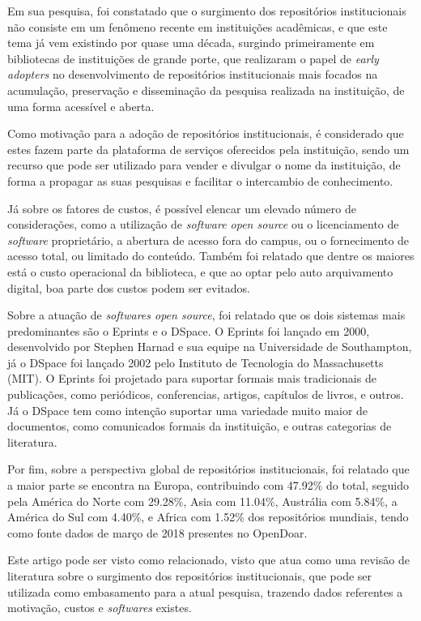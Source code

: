 Em sua pesquisa, foi constatado que o surgimento dos repositórios institucionais
não consiste em um fenômeno recente em instituições acadêmicas, e que este tema já vem
existindo por quase uma década, surgindo primeiramente em bibliotecas de instituições
de grande porte, que realizaram o papel de \emph{early adopters} no desenvolvimento
de repositórios institucionais mais focados na acumulação, preservação e disseminação
da pesquisa realizada na instituição, de uma forma acessível e aberta.

Como motivação para a adoção de repositórios institucionais, é considerado
que estes fazem parte da plataforma de serviços oferecidos pela instituição,
sendo um recurso que pode ser utilizado para vender e divulgar o nome da instituição,
de forma a propagar as suas pesquisas e facilitar o intercambio de conhecimento.

Já sobre os fatores de custos, é possível elencar um elevado número de considerações,
como a utilização de \emph{software open source} ou o licenciamento de \emph{software}
proprietário, a abertura de acesso fora do campus, ou o fornecimento de acesso total, ou
limitado do conteúdo. Também foi relatado que dentre os maiores está o custo operacional
da biblioteca, e que ao optar pelo auto arquivamento digital, boa parte dos custos
podem ser evitados.

Sobre a atuação de \emph{softwares open source}, foi relatado que os dois sistemas mais
predominantes são o Eprints e o DSpace. O Eprints foi lançado em 2000, desenvolvido por
Stephen Harnad e sua equipe na Universidade de Southampton, já o DSpace foi lançado 2002
pelo Instituto de Tecnologia do Massachusetts (MIT). O Eprints foi projetado para suportar
formais mais tradicionais de publicações, como periódicos, conferencias, artigos, capítulos
de livros, e outros. Já o DSpace tem como intenção suportar uma variedade muito maior de
documentos, como comunicados formais da instituição, e outras categorias de literatura.

Por fim, sobre a perspectiva global de repositórios institucionais, foi relatado que
a maior parte se encontra na Europa, contribuindo com 47.92\% do total,
seguido pela América do Norte com 29.28\%, Asia com 11.04\%, Austrália com 5.84\%,
a América do Sul com 4.40\%, e Africa com 1.52\% dos repositórios mundiais, tendo como fonte
dados de março de 2018 presentes no OpenDoar.

Este artigo pode ser visto como relacionado, visto que atua como uma revisão de literatura
sobre o surgimento dos repositórios institucionais, que pode ser utilizada como embasamento
para a atual pesquisa, trazendo dados referentes a motivação, custos e \emph{softwares} existes.

